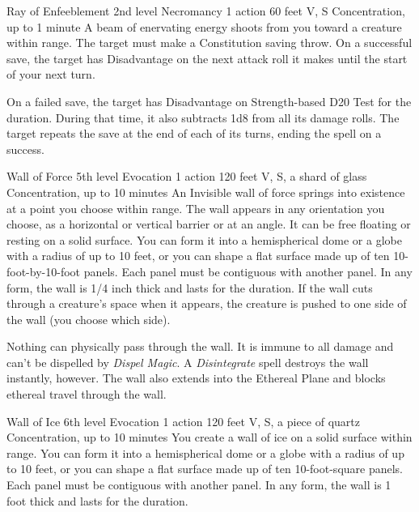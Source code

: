 \documentclass[10pt,a4paper,twoside,bg=print,twocolumn,openany,nodeprecatedcode]{dndbook}
\begin{document}


\DndSpellHeader%
{Ray of Enfeeblement}
{2nd level Necromancy}
{1 action}
{60 feet}
{V, S}
{Concentration, up to 1 minute}
A beam of enervating energy shoots from you toward a creature within range. The target must make a Constitution saving throw. On a successful save, the target has Disadvantage on the next attack roll it makes until the start of your next turn.

On a failed save, the target has Disadvantage on Strength-based D20 Test for the duration. During that time, it also subtracts 1d8 from all its damage rolls. The target repeats the save at the end of each of its turns, ending the spell on a success.



\DndSpellHeader%
{Wall of Force}
{5th level Evocation}
{1 action}
{120 feet}
{V, S, a shard of glass}
{Concentration, up to 10 minutes}
An Invisible wall of force springs into existence at a point you choose within range. The wall appears in any orientation you choose, as a horizontal or vertical barrier or at an angle. It can be free floating or resting on a solid surface. You can form it into a hemispherical dome or a globe with a radius of up to 10 feet, or you can shape a flat surface made up of ten 10-foot-by-10-foot panels. Each panel must be contiguous with another panel. In any form, the wall is 1/4 inch thick and lasts for the duration. If the wall cuts through a creature's space when it appears, the creature is pushed to one side of the wall (you choose which side).

Nothing can physically pass through the wall. It is immune to all damage and can't be dispelled by \textit{Dispel Magic}. A \textit{Disintegrate} spell destroys the wall instantly, however. The wall also extends into the Ethereal Plane and blocks ethereal travel through the wall.



\DndSpellHeader%
{Wall of Ice}
{6th level Evocation}
{1 action}
{120 feet}
{V, S, a piece of quartz}
{Concentration, up to 10 minutes}
You create a wall of ice on a solid surface within range. You can form it into a hemispherical dome or a globe with a radius of up to 10 feet, or you can shape a flat surface made up of ten 10-foot-square panels. Each panel must be contiguous with another panel. In any form, the wall is 1 foot thick and lasts for the duration.
\end{document}
